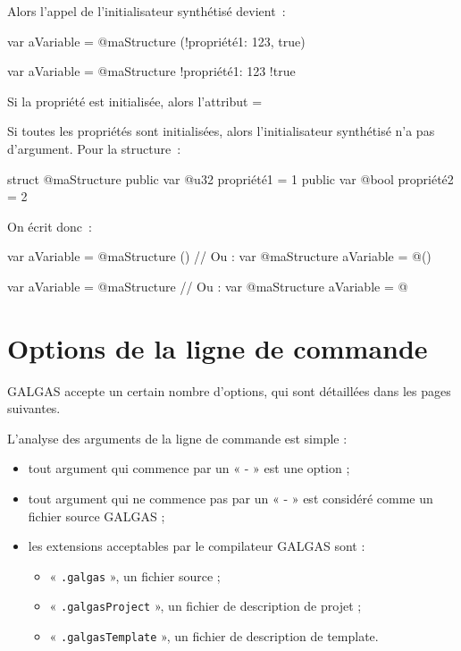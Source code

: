 Alors l'appel de l'initialisateur synthétisé devient~:
\begin{galgas4}
var aVariable = @maStructure (!propriété1: 123, true)
\end{galgas4}
\begin{galgas4}
var aVariable = @maStructure {!propriété1: 123 !true}
\end{galgas4}

Si la propriété est initialisée, alors l'attribut \ggsq=%


Si toutes les propriétés sont initialisées, alors l'initialisateur synthétisé n'a pas d'argument. Pour la structure~:
\begin{galgas4}
struct @maStructure {
  public var @u32 propriété1 = 1
  public var @bool propriété2 = 2
}
\end{galgas4}

On écrit donc~:
\begin{galgas4}
var aVariable = @maStructure ()
// Ou :
var @maStructure aVariable = @()
\end{galgas4}
\begin{galgas4}
var aVariable = @maStructure {}
// Ou :
var @maStructure aVariable = @{}
\end{galgas4}









\section{Options de la ligne de commande}

GALGAS accepte un certain nombre d’options, qui sont détaillées dans les pages suivantes.

L’analyse des arguments de la ligne de commande est simple :
\begin{itemize}
  \item tout argument qui commence par un « - » est une option ;
  \item tout argument qui ne commence pas par un « - » est considéré comme un fichier source GALGAS ;
  \item les extensions acceptables par le compilateur GALGAS sont :
  \begin{itemize}
    \item « \texttt{.galgas} », un fichier source ;
    \item « \texttt{.galgasProject} », un fichier de description de projet ;
    \item « \texttt{.galgasTemplate} », un fichier de description de template.
  \end{itemize}
\end{itemize}

